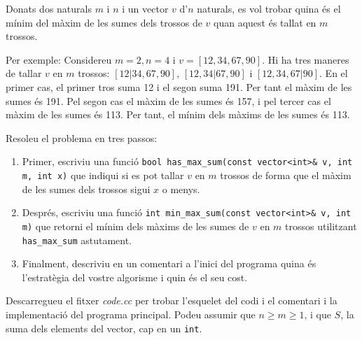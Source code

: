 
\Statement

Donats dos naturals $m$ i $n$ i un vector $v$ d'$n$ naturals, es vol trobar
quina és el mínim del màxim de les sumes dels trossos de $v$ quan aquest és
tallat en $m$ trossos.

\medskip

Per exemple: Considereu $m=2, n=4$ i $v=[12, 34, 67, 90]$. Hi ha tres maneres de
tallar $v$ en $m$ trossos: $[12 \vert 34, 67, 90]$, $[12, 34 \vert 67,
90]$ i $[12, 34, 67 \vert 90]$.  En el primer cas, el primer tros suma 12 i el
segon suma 191. Per tant el màxim de les sumes és 191. Pel segon cas el màxim de
les sumes és 157, i pel tercer cas el màxim de les sumes és 113. Per tant, el
mínim dels màxims de les sumes és 113.

\medskip

Resoleu el problema en tres passos:

\begin{enumerate}

    \item Primer, escriviu una funció
    \lstinline|bool has_max_sum(const vector<int>& v, int m, int x)| que indiqui si es pot tallar $v$ en $m$ trossos
    de forma que el màxim de les sumes dels trossos sigui $x$ o menys.

    \item Després, escriviu una funció
    \lstinline|int min_max_sum(const vector<int>& v, int m)|
    que retorni el mínim dels màxims de les sumes de $v$ en $m$
    trossos utilitzant \lstinline|has_max_sum| astutament.

    \item Finalment, descriviu en un comentari
    a l'inici del programa quina és l'estratègia
    del vostre algorisme i quin és el seu cost.


\end{enumerate}

\medskip

Descarregueu el fitxer \textit{code.cc} per trobar l'esquelet del codi i el
comentari i la implementació del programa principal. Podeu assumir que $n\geq
m\geq 1$, i que $S$, la suma dels elements del vector, cap en un \lstinline|int|.

\Sample
